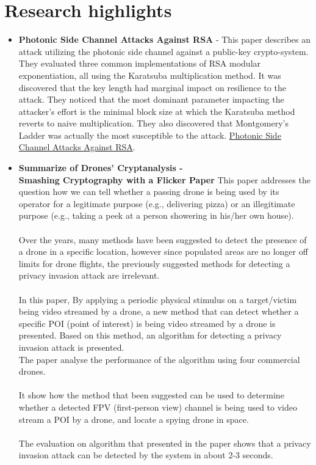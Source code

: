 \section{Research highlights} \label{sec:RelatedWork}
\begin{itemize}
    \item \textbf{Photonic Side Channel Attacks Against RSA} - This paper describes an attack utilizing the
    photonic side channel against a public-key crypto-system. They
    evaluated three common implementations of RSA modular exponentiation, all using the Karatsuba multiplication method.
    It was discovered that the key length had marginal impact on resilience to the attack.
    They noticed that the most dominant parameter impacting the attacker’s effort is the minimal block size at which the Karatsuba method reverts to naive multiplication.
    They also discovered that Montgomery’s Ladder was actually the most susceptible to the attack.
    \href{https://www.eng.tau.ac.il/~yash/ieee-host-2017.pdf}{Photonic Side Channel Attacks Against RSA}.

    \item  \textbf{Summarize of Drones’ Cryptanalysis -} 
    \\ \textbf{Smashing Cryptography with a Flicker Paper}
    This paper \cite{nassi2019drones} addresses the question how we can tell whether a passing drone is being used by its operator for a legitimate purpose (e.g., delivering pizza) or an illegitimate purpose (e.g., taking a peek at a person showering in his/her own house).\\
    \\Over the years, many methods have been suggested to detect the presence of a drone in a specific location, however since populated areas are no longer off limits for drone flights, the previously suggested methods for detecting a privacy invasion attack are irrelevant.\\ 
    \\In this paper, By applying a periodic physical stimulus on a target/victim being video streamed by a drone,  a new method that can detect whether a specific POI (point of interest) is being video streamed by a drone is presented. 
    Based on this method, an algorithm for detecting a privacy invasion attack is presented.\\ 
    The paper analyse the performance of the algorithm using four commercial drones. \\
    \\It show how the method that been suggested can be used to determine whether a detected FPV (first-person view) channel is being used to video stream a POI by a drone, and locate a spying drone in space.\\
    \\The evaluation on algorithm that presented in the paper shows that a privacy invasion attack can be detected by the system in about 2-3 seconds.

\end{itemize}
